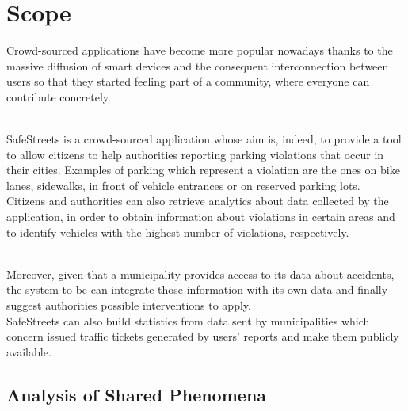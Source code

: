 \documentclass[../../rasd.tex]{subfiles}
\begin{document}
\section{Scope\label{sect:1.2}}

Crowd-sourced applications have become more popular nowadays thanks to the massive diffusion of smart devices and the consequent interconnection between users so that they started feeling part of a community, where everyone can contribute concretely.\\\

SafeStreets is a crowd-sourced application whose aim is, indeed, to provide a tool to allow citizens to help authorities reporting parking violations that occur in their cities. Examples of parking which represent a violation are the ones on bike lanes, sidewalks, in front of vehicle entrances or on reserved parking lots.\\
Citizens and authorities can also retrieve analytics about data collected by the application, in order to obtain information about violations in certain areas and to identify vehicles with the highest number of violations, respectively.\\\

Moreover, given that a municipality provides access to its data about accidents, the system to be can integrate those information with its own data and finally suggest authorities possible interventions to apply.\\
SafeStreets can also build statistics from data sent by municipalities which concern issued traffic tickets generated by users' reports and make them publicly available.

\subsection{Analysis of Shared Phenomena}




\end{document}
